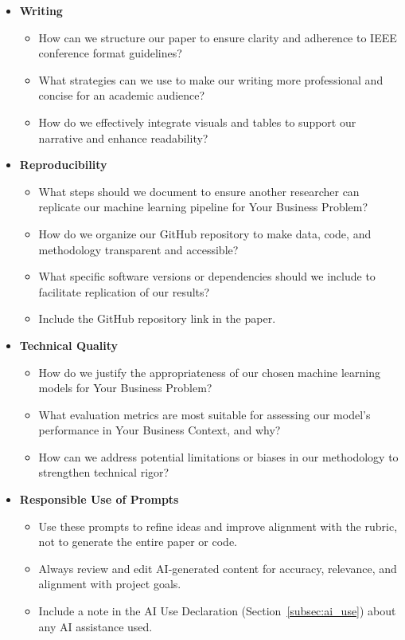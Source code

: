 \documentclass[conference]{IEEEtran}
\begin{document}
\begin{itemize}
\begin{itemize}
    \end{itemize}
    \item \textbf{Writing}
    \begin{itemize}
        \item How can we structure our paper to ensure clarity and adherence to IEEE conference format guidelines?
        \item What strategies can we use to make our writing more professional and concise for an academic audience?
        \item How do we effectively integrate visuals and tables to support our narrative and enhance readability?
    \end{itemize}
    \item \textbf{Reproducibility}
    \begin{itemize}
        \item What steps should we document to ensure another researcher can replicate our machine learning pipeline for Your Business Problem?
        \item How do we organize our GitHub repository to make data, code, and methodology transparent and accessible?
        \item What specific software versions or dependencies should we include to facilitate replication of our results?
        \item Include the GitHub repository link in the paper. 
    \end{itemize}
    \item \textbf{Technical Quality}
    \begin{itemize}
        \item How do we justify the appropriateness of our chosen machine learning models for Your Business Problem?
        \item What evaluation metrics are most suitable for assessing our model’s performance in Your Business Context, and why?
        \item How can we address potential limitations or biases in our methodology to strengthen technical rigor?
    \end{itemize}
    \item \textbf{Responsible Use of Prompts}
    \begin{itemize}
        \item Use these prompts to refine ideas and improve alignment with the rubric, not to generate the entire paper or code.
        \item Always review and edit AI-generated content for accuracy, relevance, and alignment with project goals.
        \item Include a note in the AI Use Declaration (Section~\ref{subsec:ai_use}) about any AI assistance used.
    \end{itemize}
\end{itemize}
\end{document}
